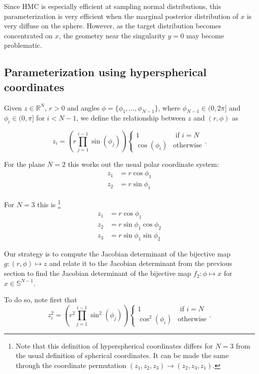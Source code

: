 \documentclass[11pt]{article}
\begin{document}
Since HMC is especially efficient at sampling normal distributions, this parameterization is very efficient when the marginal posterior distribution of $x$ is very diffuse on the sphere.
However, as the target distribution becomes concentrated on $x$, the geometry near the singularity $y=0$ may become problematic.

\subsection{Parameterization using hyperspherical coordinates}

Given $z \in \mathbb{R}^N$, $r > 0$ and angles $\phi=\{\phi_1, \ldots, \phi_{N-1}\}$, where $\phi_{N-1} \in (0, 2\pi]$ and $\phi_i \in (0, \pi]$ for $i < N-1$, we define the relationship between $z$ and $(r, \phi)$ as

\[
  z_i = \left(r \prod_{j=1}^{i-1} \sin(\phi_j)\right) \begin{cases}
    1 & \text{ if } i = N\\
    \cos(\phi_i) & \text{otherwise}
  \end{cases}.
\]

For the plane $N=2$ this works out the usual polar coordinate system:
\[
    \begin{aligned}
        z_1 &= r \cos\phi_1\\
        z_2 &= r \sin\phi_1
    \end{aligned}
\]

For $N=3$ this is \footnote{
    Note that this definition of hyperspherical coordinates differs for $N=3$ from the usual definition of spherical coordinates.
    It can be made the same through the coordinate permutation $(z_1, z_2, z_3) \to (z_2, z_3, z_1)$.
}
\[
    \begin{aligned}
        z_1 &= r \cos\phi_1\\
        z_2 &= r \sin\phi_1\cos\phi_2\\
        z_3 &= r \sin\phi_1\sin\phi_2
    \end{aligned}
\]

Our strategy is to compute the Jacobian determinant of the bijective map $g: (r, \phi) \mapsto z$ and relate it to the Jacobian determinant from the previous section to find the Jacobian determinant of the bijective map $f_2: \phi \mapsto x$ for $x \in \mathbb{S}^{N-1}$.

To do so, note first that
\[
  z_i^2 = \left(r^2 \prod_{j=1}^{i-1} \sin^2(\phi_j)\right) \begin{cases}
    1 & \text{ if } i = N\\
    \cos^2(\phi_i) & \text{otherwise}
  \end{cases}.
\]
\end{document}
